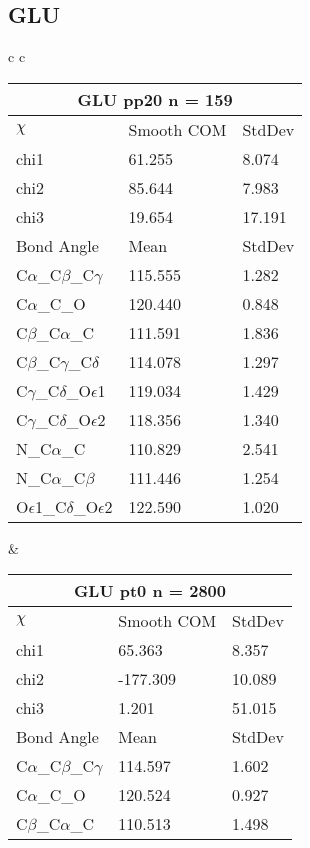 \newpage
\subsection{GLU}

\begin{longtable}{ c c }

  \begin{tabular}{ l l l }
  \toprule
  \multicolumn{3}{c}{GLU \textbf{pp20} n = 159} \\ \toprule
  $\chi$       & Smooth COM & StdDev \\ \midrule
  chi1 & 61.255 & 8.074 \\ 
  chi2 & 85.644 & 7.983 \\ 
  chi3 & 19.654 & 17.191 \\ \midrule
  Bond Angle   & Mean     & StdDev \\ \midrule
  C$\alpha$\_C$\beta$\_C$\gamma$ & 115.555 & 1.282\\
  C$\alpha$\_C\_O & 120.440 & 0.848\\
  C$\beta$\_C$\alpha$\_C & 111.591 & 1.836\\
  C$\beta$\_C$\gamma$\_C$\delta$ & 114.078 & 1.297\\
  C$\gamma$\_C$\delta$\_O$\epsilon$1 & 119.034 & 1.429\\
  C$\gamma$\_C$\delta$\_O$\epsilon$2 & 118.356 & 1.340\\
  N\_C$\alpha$\_C & 110.829 & 2.541\\
  N\_C$\alpha$\_C$\beta$ & 111.446 & 1.254\\
  O$\epsilon$1\_C$\delta$\_O$\epsilon$2 & 122.590 & 1.020\\
  \bottomrule
  \end{tabular}
  &
  \begin{tabular}{ l l l }
  \toprule
  \multicolumn{3}{c}{GLU \textbf{pt0} n = 2800} \\ \toprule
  $\chi$       & Smooth COM & StdDev \\ \midrule
  chi1 & 65.363 & 8.357 \\ 
  chi2 & -177.309 & 10.089 \\ 
  chi3 & 1.201 & 51.015 \\ \midrule
  Bond Angle   & Mean     & StdDev \\ \midrule
  C$\alpha$\_C$\beta$\_C$\gamma$ & 114.597 & 1.602\\
  C$\alpha$\_C\_O & 120.524 & 0.927\\
  C$\beta$\_C$\alpha$\_C & 110.513 & 1.498\\

\end{tabular}
\end{longtable}
